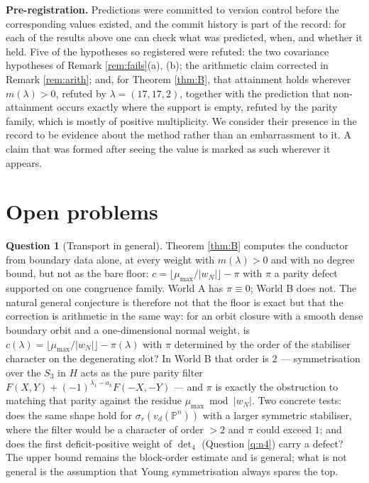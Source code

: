 \documentclass[11pt,reqno]{amsart}
\theoremstyle{plain}
\theoremstyle{definition}
\newtheorem{question}[theorem]{Question}
\begin{document}
\smallskip
\noindent\textbf{Pre-registration.}  Predictions were committed to version
control before the corresponding values existed, and the commit history is
part of the record: for each of the results above one can check what was
predicted, when, and whether it held.  Five of the hypotheses so registered
were refuted: the two covariance hypotheses of Remark \ref{rem:fails}(a), (b);
the arithmetic claim corrected in Remark \ref{rem:arith}; and, for Theorem
\ref{thm:B}, that attainment holds wherever $m(\lambda)>0$, refuted by
$\lambda=(17,17,2)$, together with the prediction that non-attainment occurs
exactly where the support is empty, refuted by the parity family, which is
mostly of positive multiplicity.  We consider their presence in the record
to be evidence about the method rather than an embarrassment to it.  A claim
that was formed after seeing the value is marked as such wherever it appears.

\section{Open problems}\label{sec:open}

\begin{question}[Transport in general]\label{q:transport}
Theorem \ref{thm:B} computes the conductor from boundary data alone, at every
weight with $m(\lambda)>0$ and with no degree bound, but not as the bare floor:
$c=\lfloor\mu_{\max}/|w_N|\rfloor-\pi$ with $\pi$ a parity defect supported on
one congruence family.  World A has $\pi\equiv0$; World B does not.  The natural
general conjecture is therefore not that the floor is exact but that the
correction is arithmetic in the same way: for an orbit closure with a smooth
dense boundary orbit and a one-dimensional normal weight, is
$c(\lambda)=\lfloor\mu_{\max}/|w_N|\rfloor-\pi(\lambda)$ with $\pi$ determined by
the order of the stabiliser character on the degenerating slot?  In World B that
order is $2$ --- symmetrisation over the $S_3$ in $H$ acts as the pure parity
filter $F(X,Y)+(-1)^{\lambda_1-a_k}F(-X,-Y)$ --- and $\pi$ is exactly the
obstruction to matching that parity against the residue
$\mu_{\max}\bmod|w_N|$.  Two concrete tests: does the same shape hold for
$\sigma_r(v_d(\mathbb{P}^{n}))$ with a larger symmetric stabiliser, where the filter
would be a character of order $>2$ and $\pi$ could exceed $1$; and does the
first deficit-positive weight of $\det_4$ (Question \ref{q:n4}) carry a defect?
The upper bound remains the block-order estimate and is general; what is not
general is the assumption that Young symmetrisation always spares the top.
\end{question}
\end{document}
